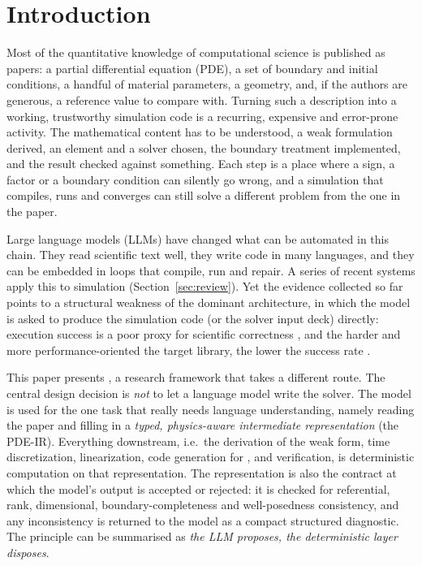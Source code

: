 \section{Introduction}
\label{sec:intro}

Most of the quantitative knowledge of computational science is published as papers: a partial differential equation (PDE), a set of boundary and initial conditions, a handful of material parameters, a geometry, and, if the authors are generous, a reference value to compare with. Turning such a description into a working, trustworthy simulation code is a recurring, expensive and error-prone activity. The mathematical content has to be understood, a weak formulation derived, an element and a solver chosen, the boundary treatment implemented, and the result checked against something. Each step is a place where a sign, a factor or a boundary condition can silently go wrong, and a simulation that compiles, runs and converges can still solve a different problem from the one in the paper.

Large language models (LLMs) have changed what can be automated in this chain. They read scientific text well, they write code in many languages, and they can be embedded in loops that compile, run and repair. A series of recent systems apply this to simulation (Section~\ref{sec:review}). Yet the evidence collected so far points to a structural weakness of the dominant architecture, in which the model is asked to produce the simulation code (or the solver input deck) directly: execution success is a poor proxy for scientific correctness \citep{wrongphysics2026,fembench2025}, and the harder and more performance-oriented the target library, the lower the success rate \citep{pdeagentbench2026}.

This paper presents \femagent{}, a research framework that takes a different route. The central design decision is \emph{not} to let a language model write the solver. The model is used for the one task that really needs language understanding, namely reading the paper and filling in a \emph{typed, physics-aware intermediate representation} (the PDE-IR). Everything downstream, i.e.\ the derivation of the weak form, time discretization, linearization, code generation for \dealii{} \citep{arndt2023}, and verification, is deterministic computation on that representation. The representation is also the contract at which the model's output is accepted or rejected: it is checked for referential, rank, dimensional, boundary-completeness and well-posedness consistency, and any inconsistency is returned to the model as a compact structured diagnostic. The principle can be summarised as \emph{the LLM proposes, the deterministic layer disposes}.

